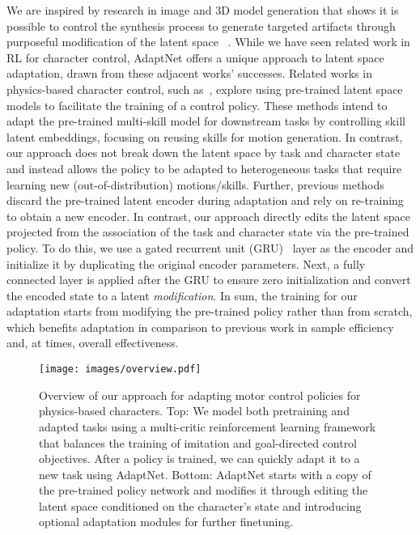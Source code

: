 We are inspired by research in image and 3D model generation that shows it is possible to control the synthesis process to generate targeted artifacts through purposeful modification of the 
latent space%
~\cite{radford2015unsupervised,zhuang2021enjoy,epstein2022blobgan,pmlr-v80-bojanowski18a,abdal2019image2stylegan,shen2020interpreting,wu2016learning,berthelot2017began,karras2020analyzing}.
While we have seen related work in RL for character control, AdaptNet offers a unique approach to
latent space adaptation, drawn from these adjacent works' successes.
Related works in physics-based character control, such as~\cite{ling2020character,peng2022ase,2022-SA-PADL,tessler2023calm,won2021control, MCPPeng19}, explore using pre-trained latent space models to facilitate the training of a control policy. 
These methods intend to adapt the pre-trained multi-skill model for downstream tasks by controlling skill latent embeddings, focusing on reusing skills for motion generation.  
In contrast, 
our approach does not break down the latent space by task and character state and instead allows the policy to be adapted to heterogeneous tasks that require learning new (out-of-distribution) motions/skills.
Further, previous methods discard the pre-trained latent encoder during adaptation and rely on re-training to obtain a new encoder.
In contrast, 
our approach directly edits the latent space projected from the association of the task and character state via the pre-trained policy.  To do this, we use a
gated recurrent unit (GRU)~\cite{chung2014empirical} 
layer as the encoder and initialize it by duplicating the original encoder parameters.  Next, a fully connected layer is applied after the GRU to ensure zero initialization and convert the encoded state to a latent \emph{modification}. 
In sum, the training for our adaptation starts from modifying the pre-trained policy rather than from scratch, 
which benefits adaptation in comparison to previous work in sample efficiency and, at times, overall effectiveness.






\begin{figure}[t]
    \centering
    \texttt{[image: images/overview.pdf]}
    \caption{Overview of our approach for 
    adapting motor control policies for physics-based characters. Top: We model both pretraining and adapted tasks using 
    a multi-critic reinforcement learning framework that balances the training of imitation and goal-directed control objectives. After a policy is trained, we can quickly adapt it to a new task using AdaptNet. Bottom: AdaptNet starts with a copy of the pre-trained policy network and modifies it through %
     editing the latent space conditioned on the character's state and introducing optional %
     adaptation modules for further finetuning.
    }
    \label{fig:overview}
\end{figure}

